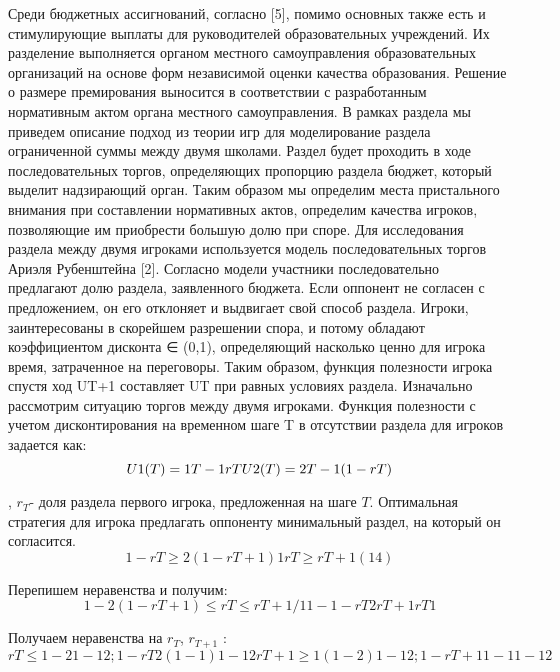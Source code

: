 Среди бюджетных ассигнований, согласно [5], помимо основных также есть и стимулирующие выплаты для руководителей образовательных учреждений. Их разделение выполняется органом местного самоуправления образовательных организаций на основе форм независимой оценки качества образования. Решение о размере премирования выносится в соответствии с разработанным нормативным актом органа местного самоуправления. 
В рамках раздела мы приведем описание подход из теории игр для моделирование раздела ограниченной суммы между двумя школами. Раздел будет проходить в ходе последовательных торгов, определяющих пропорцию раздела бюджет, который выделит надзирающий орган. Таким образом мы определим места пристального внимания при составлении нормативных актов, определим качества игроков, позволяющие им приобрести большую долю при споре.
Для исследования раздела между двумя игроками используется модель последовательных торгов Ариэля Рубенштейна [2].  Согласно модели участники последовательно предлагают долю раздела, заявленного бюджета. Если оппонент не согласен с предложением, он его отклоняет и выдвигает свой способ раздела.  Игроки, заинтересованы в скорейшем разрешении спора, и потому обладают коэффициентом дисконта  ∈ (0,1), определяющий насколько ценно для игрока время, затраченное на переговоры. Таким образом, функция полезности игрока спустя ход UT+1 составляет UT при равных условиях раздела.
Изначально рассмотрим ситуацию торгов между двумя игроками. Функция полезности с учетом дисконтирования на временном шаге T в отсутствии раздела для игроков задается как:
\begin{equation}
	U1  (T)= 1 T-1rT  \\
	U2 (T)=2 T-1(1-rT) 
\end{equation}

, $r_T$- доля раздела первого игрока, предложенная на шаге $T$.
Оптимальная стратегия для игрока предлагать оппоненту минимальный раздел, на который он согласится. 
\begin{equation}
	1 - rT  ≥ 2(1-rT+1)  

1 rT  ≥rT+1 (14)
\end{equation}

Перепишем неравенства и получим:
\begin{equation}
	1-2(1-rT+1) ≤rT ≤rT+1 /1 
	1-1-rT2rT+1rT1 
\end{equation}

Получаем неравенства на $r_T$, $r_{T+1}$ :
\begin{equation}
	rT ≤ 1-2 1-12 ;1 -rT 2(1-1)1-1 2
 rT+1 ≥  1(1-2)1-12 ; 1 -rT+1 1-11-1 2  
\end{equation}

